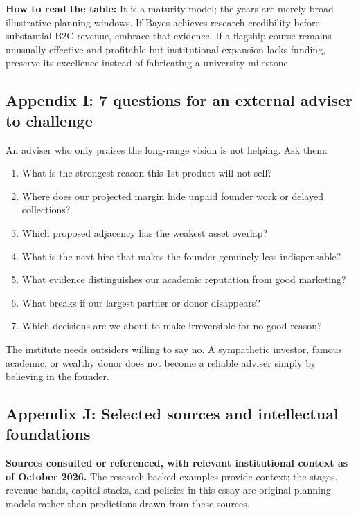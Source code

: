 \textbf{How to read the table:} It is a maturity model; the years are merely broad illustrative planning windows. If Bayes achieves research credibility before substantial B2C revenue, embrace that evidence. If a flagship course remains unusually effective and profitable but institutional expansion lacks funding, preserve its excellence instead of fabricating a university milestone.

\subsection{Appendix I: 7 questions for an external adviser to challenge}

An adviser who only praises the long-range vision is not helping. Ask them:

\begin{enumerate}[leftmargin=*,itemsep=1.5pt]
  \item What is the strongest reason this 1st product will not sell?
  \item Where does our projected margin hide unpaid founder work or delayed collections?
  \item Which proposed adjacency has the weakest asset overlap?
  \item What is the next hire that makes the founder genuinely less indispensable?
  \item What evidence distinguishes our academic reputation from good marketing?
  \item What breaks if our largest partner or donor disappears?
  \item Which decisions are we about to make irreversible for no good reason?
\end{enumerate}

The institute needs outsiders willing to say no. A sympathetic investor, famous academic, or wealthy donor does not become a reliable adviser simply by believing in the founder.

\subsection{Appendix J: Selected sources and intellectual foundations}

\textbf{Sources consulted or referenced, with relevant institutional context as of October 2026.} The research-backed examples provide context; the stages, revenue bands, capital stacks, and policies in this essay are original planning models rather than predictions drawn from these sources.

